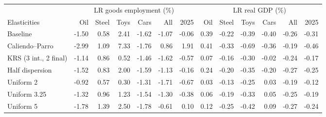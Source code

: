 \begin{tabular}{lrrrrrrrrrrrr}
\toprule
 & \multicolumn{6}{c}{LR goods employment (\%)} & \multicolumn{6}{c}{LR real GDP (\%)} \\
\cmidrule(lr){2-7}\cmidrule(lr){8-13}
Elasticities & Oil & Steel & Toys & Cars & All & 2025 & Oil & Steel & Toys & Cars & All & 2025 \\
\midrule
Baseline & -1.50 & 0.58 & 2.41 & -1.62 & -1.07 & -0.06 & 0.39 & -0.22 & -0.39 & -0.40 & -0.26 & -0.31 \\
Caliendo--Parro & -2.99 & 1.09 & 7.33 & -1.76 & 0.86 & 1.91 & 0.41 & -0.33 & -0.69 & -0.36 & -0.19 & -0.46 \\
KRS (3 int., 2 final) & -1.14 & 0.86 & 0.52 & -1.46 & -1.62 & -0.57 & 0.07 & -0.16 & -0.30 & -0.02 & -0.24 & -0.17 \\
Half dispersion & -1.52 & 0.83 & 2.00 & -1.59 & -1.13 & -0.16 & 0.24 & -0.20 & -0.35 & -0.20 & -0.27 & -0.25 \\
Uniform 2 & -0.92 & 0.57 & 0.30 & -1.31 & -1.71 & -0.67 & 0.03 & -0.13 & -0.25 & 0.03 & -0.19 & -0.12 \\
Uniform 3.25 & -1.32 & 0.96 & 1.23 & -1.54 & -1.30 & -0.38 & 0.06 & -0.19 & -0.33 & 0.05 & -0.25 & -0.19 \\
Uniform 5 & -1.78 & 1.39 & 2.50 & -1.78 & -0.61 & 0.10 & 0.12 & -0.25 & -0.42 & 0.09 & -0.27 & -0.24 \\
\bottomrule
\end{tabular}
